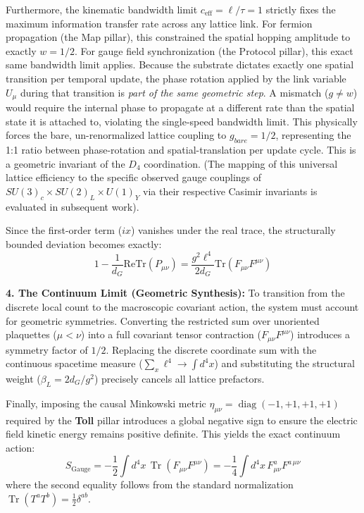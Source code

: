 Furthermore, the kinematic bandwidth limit $c_{\mathrm{eff}} = \ell/\tau = 1$ strictly fixes the maximum information transfer rate across any lattice link. For fermion propagation (the Map pillar), this constrained the spatial hopping amplitude to exactly $w = 1/2$. For gauge field synchronization (the Protocol pillar), this exact same bandwidth limit applies. Because the substrate dictates exactly one spatial transition per temporal update, the phase rotation applied by the link variable $U_\mu$ during that transition is \emph{part of the same geometric step}. A mismatch ($g \neq w$) would require the internal phase to propagate at a different rate than the spatial state it is attached to, violating the single-speed bandwidth limit. This physically forces the bare, un-renormalized lattice coupling to $g_{bare} = 1/2$, representing the 1:1 ratio between phase-rotation and spatial-translation per update cycle. This is a geometric invariant of the $D_4$ coordination. (The mapping of this universal lattice efficiency to the specific observed gauge couplings of $SU(3)_c \times SU(2)_L \times U(1)_Y$ via their respective Casimir invariants is evaluated in subsequent work).

Since the first-order term ($ix$) vanishes under the real trace, the structurally bounded deviation becomes exactly:
\begin{equation}
    1 - \frac{1}{d_G} \text{Re}\text{Tr}(P_{\mu\nu}) = \frac{g^2 \ell^4}{2d_G} \text{Tr}(F_{\mu\nu}F^{\mu\nu})
\end{equation}

\textbf{4. The Continuum Limit (Geometric Synthesis):}
To transition from the discrete local count to the macroscopic covariant action, the system must account for geometric symmetries. Converting the restricted sum over unoriented plaquettes ($\mu < \nu$) into a full covariant tensor contraction ($F_{\mu\nu}F^{\mu\nu}$) introduces a symmetry factor of $1/2$. Replacing the discrete 
coordinate sum with the continuous spacetime measure ($\sum_{x} \ell^4 \to \int d^4x$) and substituting the structural weight ($\beta_L = 2d_G/g^2$) precisely cancels all lattice prefactors.

Finally, imposing the causal Minkowski metric $\eta_{\mu\nu} = \operatorname{diag}(-1, +1, +1, +1)$ required by the \textbf{Toll} pillar introduces a global negative sign to ensure the electric field kinetic energy remains positive definite. This yields the exact continuum action:
\begin{equation}
    S_{\text{Gauge}} = -\frac{1}{2} \int d^4x\, \operatorname{Tr}(F_{\mu\nu}F^{\mu\nu}) = -\frac{1}{4} \int d^4x\, F^a_{\mu\nu}F^{a\,\mu\nu}
\end{equation}
where the second equality follows from the standard normalization $\operatorname{Tr}(T^a T^b) = \frac{1}{2}\delta^{ab}$.

